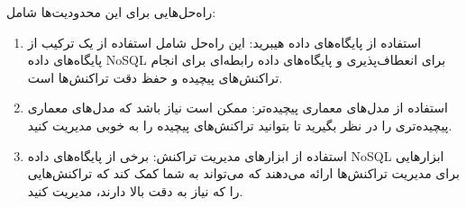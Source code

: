 راه‌حل‌هایی برای این محدودیت‌ها شامل:
\begin{enumerate}

\item  استفاده از پایگاه‌های داده هیبرید: این راه‌حل شامل استفاده از یک ترکیب از پایگاه‌های داده NoSQL برای انعطاف‌پذیری و پایگاه‌های داده رابطه‌ای برای انجام تراکنش‌های پیچیده و حفظ دقت تراکنش‌ها است.

\item  استفاده از مدل‌های معماری پیچیده‌تر: ممکن است نیاز باشد که مدل‌های معماری پیچیده‌تری را در نظر بگیرید تا بتوانید تراکنش‌های پیچیده را به خوبی مدیریت کنید.

\item  استفاده از ابزارهای مدیریت تراکنش: برخی از پایگاه‌های داده NoSQL ابزارهایی برای مدیریت تراکنش‌ها ارائه می‌دهند که می‌تواند به شما کمک کند که تراکنش‌هایی را که نیاز به دقت بالا دارند، مدیریت کنید.

\end{enumerate}








